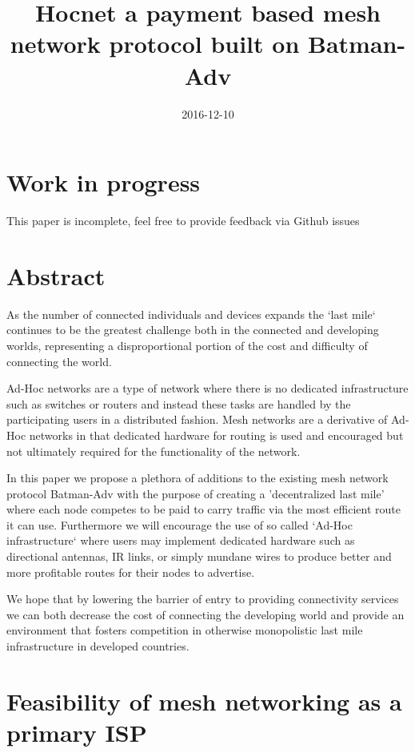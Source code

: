 \documentclass[11pt]{article}
\title{\textbf{Hocnet a payment based mesh network protocol built on Batman-Adv}}
\date{2016-12-10}
\begin{document}
\maketitle

\section{Work in progress}

This paper is incomplete, feel free to provide feedback via Github issues

\tableofcontents

\section{Abstract}

As the number of connected individuals and devices expands the `last mile` continues to be the greatest challenge both in the connected and developing worlds, representing a disproportional portion of the cost and difficulty of connecting the world.

Ad-Hoc networks are a type of network where there is no dedicated infrastructure such as switches or routers and instead these tasks are handled by the participating users in a distributed fashion. Mesh networks are a derivative of Ad-Hoc networks in that dedicated hardware for routing is used and encouraged but not ultimately required for the functionality of the network. 

In this paper we propose a plethora of additions to the existing mesh network protocol Batman-Adv with the purpose of creating a 'decentralized last mile' where each node competes to be paid to carry traffic via the most efficient route it can use. Furthermore we will encourage the use of so called `Ad-Hoc infrastructure` where users may implement dedicated hardware such as directional antennas, IR links, or simply mundane wires to produce better and more profitable routes for their nodes to advertise.

We hope that by lowering the barrier of entry to providing connectivity services we can both decrease the cost of connecting the developing world and provide an environment that fosters competition in otherwise monopolistic last mile infrastructure in developed countries.

\section{Feasibility of mesh networking as a primary ISP} 
\end{document}
